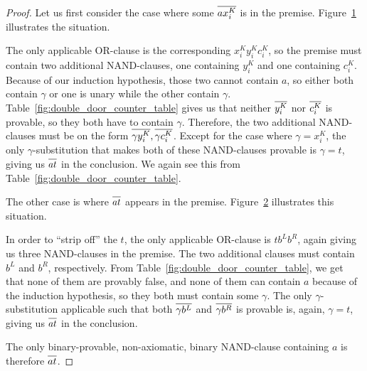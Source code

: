 \begin{proof}
Let us first consider the case where some $\ol{ax^K_i}$ is in the premise.
Figure~\ref{fig:nand_base_case} illustrates the situation.\par
\begin{figure}[!h]
  \centering
  \begin{prooftree*}
    \Hypo{\dots}
    \Hypo{\dots}
  \end{prooftree*}
  \caption{}
  \label{fig:nand_base_case}
\end{figure}
The only applicable OR-clause is the corresponding $x^K_iy^K_ic^K_i$, so the premise must contain two additional NAND-clauses, one containing $y^K_i$ and one containing $c^K_i$.
Because of our induction hypothesis, those two cannot contain $a$, so either both contain $\gamma$ or one is unary while the other contain $\gamma$.
Table~\ref{fig:double_door_counter_table} gives us that neither $\ol{y^K_i}$ nor $\ol{c^K_i}$ is provable, so they both have to contain $\gamma$.
Therefore, the two additional NAND-clauses must be on the form $\ol{\gamma y^K_i},\ol{\gamma c^K_i}$.
Except for the case where $\gamma = x^K_i$, the only $\gamma$-substitution that makes both of these NAND-clauses provable is $\gamma = t$, giving us $\ol{at}$ in the conclusion.
We again see this from Table~\ref{fig:double_door_counter_table}.

The other case is where $\ol{at}$ appears in the premise.
Figure~\ref{fig:nand_inductive_step} illustrates this situation.\par
\begin{figure}[!h]
  \centering
  \begin{prooftree*}
    \Hypo{\dots}
    \Hypo{\dots}
    \Hypo{\dots}
  \end{prooftree*}
  \caption{}
  \label{fig:nand_inductive_step}
\end{figure}
In order to ``strip off'' the $t$, the only applicable OR-clause is $tb^Lb^R$, again giving us three NAND-clauses in the premise.
The two additional clauses must contain $b^L$ and $b^R$, respectively.
From Table~\ref{fig:double_door_counter_table}, we get that none of them are provably false, and none of them can contain $a$ because of the induction hypothesis, so they both must contain some $\gamma$.
The only $\gamma$-substitution applicable such that both $\ol{\gamma b^L}$ and $\ol{\gamma b^R}$ is provable is, again, $\gamma = t$, giving us $\ol{at}$ in the conclusion.

The only binary-provable, non-axiomatic, binary NAND-clause containing $a$ is therefore $\ol{at}$.
\end{proof}

